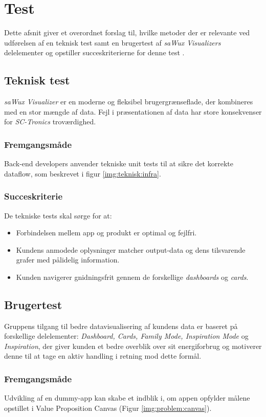 \chapter{Test}
Dette afsnit giver et overordnet forslag til, hvilke metoder der er relevante ved udførelsen af en teknisk test samt en brugertest af \emph{saWux Visualizers} delelementer og opstiller succeskriterierne for denne test \cite[Kap. 9]{finkelstein}.

\section{Teknisk test}
\emph{saWux Visualizer} er en moderne og fleksibel brugergrænseflade, der kombineres med en stor mængde af data. Fejl i præsentationen af data har store konsekvenser for \emph{SC-Tronics} troværdighed.

\subsection{Fremgangsmåde}
Back-end developers anvender tekniske unit tests til at sikre det korrekte dataflow, som beskrevet i figur \ref{img:teknisk:infra}.

\subsection{Succeskriterie}
De tekniske tests skal sørge for at:
\begin{itemize}
    \item Forbindelsen mellem app og produkt er optimal og fejlfri.
    \item Kundens anmodede oplysninger matcher output-data og dens tilsvarende grafer med pålidelig information.
    \item Kunden navigerer gnidningsfrit gennem de forskellige \emph{dashboards} og \emph{cards}.
\end{itemize}

\section{Brugertest}
Gruppens tilgang til bedre datavisualisering af kundens data er baseret på forskellige delelementer: \emph{Dashboard, Cards, Family Mode, Inspiration Mode} og \emph{Inspiration}, der giver kunden et bedre overblik over sit energiforbrug og motiverer denne til at tage en aktiv handling i retning mod dette formål.

\subsection{Fremgangsmåde}
Udvikling af en dummy-app kan skabe et indblik i, om appen opfylder målene opstillet i Value Proposition Canvas (Figur \ref{img:problem:canvas}).

